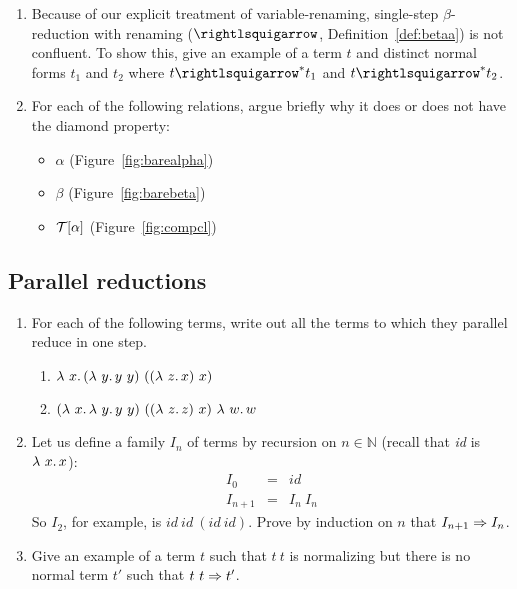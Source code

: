 \begin{enumerate}
  \item Because of our explicit treatment of variable-renaming, single-step $\beta$-reduction with renaming
     ($\betaa$, Definition~\ref{def:betaa}) is not
    confluent. To show this, give an example of a term $t$ and
    distinct normal forms $t_1$ and $t_2$ where $t \curva^* t_1$ and
    $t \curva^* t_2$.

  \item For each of the following relations, argue briefly why it does or does not have the diamond property:
    \begin{itemize}
    \item $\alpha$ (Figure~\ref{fig:barealpha})
    \item $\beta$ (Figure~\ref{fig:barebeta})
    \item $\mathcal{T}[\alpha]$ (Figure~\ref{fig:compcl})
    \end{itemize}

    \end{enumerate}

\subsection{Parallel reductions}

\begin{enumerate}
\item For each of the following terms, write out all the terms to which they parallel reduce in one step.
  \begin{enumerate}
  \item $\lam{x}{(\lam{y}{y\ y})\ ((\lam{z}{x})\ x)}$
  \item $(\lam{x}{\lam{y}{y\ y}})\ ((\lam{z}{z})\ x)\ \lam{w}{w}$
  \end{enumerate}

\item Let us define a family $I_n$ of terms by recursion on $n\in\mathbb{N}$ (recall that \textit{id} is $\lambda\ x.\, x$):
  \[
  \begin{array}{lll}
    I_0 & = & \textit{id} \\
    I_{n+1} & = & I_n\ I_n
  \end{array}
  \]
  \noindent So $I_2$, for example, is
  $\textit{id}\ \textit{id}\ (\textit{id}\ \textit{id})$.  Prove by
  induction on $n$ that $I_{n+1} \Rightarrow I_n$.

  \item Give an example of a term $t$ such that $t\ t$ is normalizing but there is no normal term $t'$ such that $t\ t\Rightarrow t'$.

\end{enumerate}




